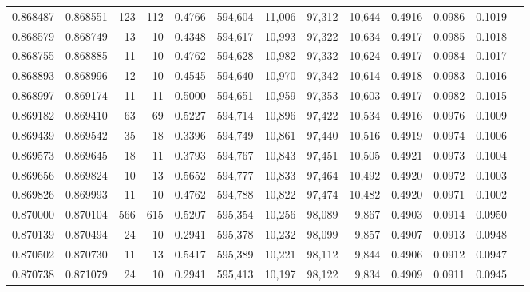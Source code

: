 \begin{tabular}{rrrrrrrrrrrrr}
0.868487 & 0.868551 &   123 & 112 &                                     0.4766 & 594,604 &  11,006 &  97,312 &  10,644 & 0.4916 & 0.0986 & 0.1019 \\
0.868579 & 0.868749 &    13 &  10 &                                     0.4348 & 594,617 &  10,993 &  97,322 &  10,634 & 0.4917 & 0.0985 & 0.1018 \\
0.868755 & 0.868885 &    11 &  10 &                                     0.4762 & 594,628 &  10,982 &  97,332 &  10,624 & 0.4917 & 0.0984 & 0.1017 \\
0.868893 & 0.868996 &    12 &  10 &                                     0.4545 & 594,640 &  10,970 &  97,342 &  10,614 & 0.4918 & 0.0983 & 0.1016 \\
0.868997 & 0.869174 &    11 &  11 &                                     0.5000 & 594,651 &  10,959 &  97,353 &  10,603 & 0.4917 & 0.0982 & 0.1015 \\
0.869182 & 0.869410 &    63 &  69 &                                     0.5227 & 594,714 &  10,896 &  97,422 &  10,534 & 0.4916 & 0.0976 & 0.1009 \\
0.869439 & 0.869542 &    35 &  18 &                                     0.3396 & 594,749 &  10,861 &  97,440 &  10,516 & 0.4919 & 0.0974 & 0.1006 \\
0.869573 & 0.869645 &    18 &  11 &                                     0.3793 & 594,767 &  10,843 &  97,451 &  10,505 & 0.4921 & 0.0973 & 0.1004 \\
0.869656 & 0.869824 &    10 &  13 &                                     0.5652 & 594,777 &  10,833 &  97,464 &  10,492 & 0.4920 & 0.0972 & 0.1003 \\
0.869826 & 0.869993 &    11 &  10 &                                     0.4762 & 594,788 &  10,822 &  97,474 &  10,482 & 0.4920 & 0.0971 & 0.1002 \\
0.870000 & 0.870104 &   566 & 615 &                                     0.5207 & 595,354 &  10,256 &  98,089 &   9,867 & 0.4903 & 0.0914 & 0.0950 \\
0.870139 & 0.870494 &    24 &  10 &                                     0.2941 & 595,378 &  10,232 &  98,099 &   9,857 & 0.4907 & 0.0913 & 0.0948 \\
0.870502 & 0.870730 &    11 &  13 &                                     0.5417 & 595,389 &  10,221 &  98,112 &   9,844 & 0.4906 & 0.0912 & 0.0947 \\
0.870738 & 0.871079 &    24 &  10 &                                     0.2941 & 595,413 &  10,197 &  98,122 &   9,834 & 0.4909 & 0.0911 & 0.0945 \\

\end{tabular}
